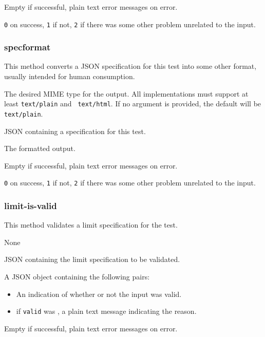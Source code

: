 \documentclass[10pt,titlepage]{article}
\begin{document}
 Empty if successful, plain text error
messages on error.

 {\tt 0} on success, {\tt 1} if not, {\tt 2}
if there was some other problem unrelated to the input.


\subsubsection{specformat}
This method converts a JSON specification for this test into some
other format, usually intended for human consumption.

 The desired MIME type for the output.  All
implementations must support at least {\tt text/plain} and {\tt
  text/html}.  If no argument is provided, the default will be {\tt
  text/plain}.

 JSON containing a specification for this
test.

 The formatted output.

 Empty if successful, plain text error
messages on error.

 {\tt 0} on success, {\tt 1} if not, {\tt 2}
if there was some other problem unrelated to the input.


\subsubsection{limit-is-valid}
This method validates a limit specification for the test.

 None

 JSON containing the limit specification
to be validated.

 A JSON object containing the following pairs:

\begin{itemize}
\item {} An indication of whether or not the
  input was valid.

\item {} if {\tt valid} was \false, a plain
  text message indicating the reason.
\end{itemize}

 Empty if successful, plain text error
messages on error.
\end{document}
